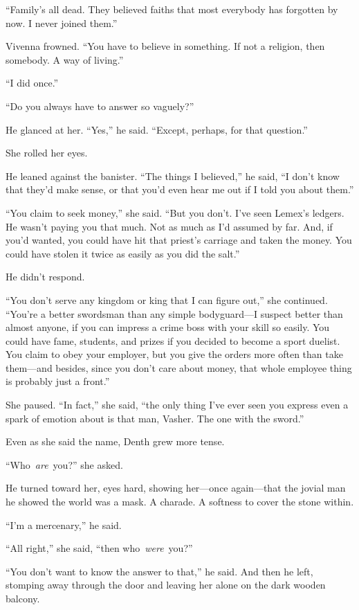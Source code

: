 “Family’s all dead. They believed faiths that most everybody has forgotten by now. I never joined them.”

Vivenna frowned. “You have to believe in something. If not a religion, then somebody. A way of living.”

“I did once.”

“Do you always have to answer so vaguely?”

He glanced at her. “Yes,” he said. “Except, perhaps, for that question.”

She rolled her eyes.

He leaned against the banister. “The things I believed,” he said, “I don’t know that they’d make sense, or that you’d even hear me out if I told you about them.”

“You claim to seek money,” she said. “But you don’t. I’ve seen Lemex’s ledgers. He wasn’t paying you that much. Not as much as I’d assumed by far. And, if you’d wanted, you could have hit that priest’s carriage and taken the money. You could have stolen it twice as easily as you did the salt.”

He didn’t respond.

“You don’t serve any kingdom or king that I can figure out,” she continued. “You’re a better swordsman than any simple bodyguard—I suspect better than almost anyone, if you can impress a crime boss with your skill so easily. You could have fame, students, and prizes if you decided to become a sport duelist. You claim to obey your employer, but you give the orders more often than take them—and besides, since you don’t care about money, that whole employee thing is probably just a front.”

She paused. “In fact,” she said, “the only thing I’ve ever seen you express even a spark of emotion about is that man, Vasher. The one with the sword.”

Even as she said the name, Denth grew more tense.

“Who~\textit{are}~you?” she asked.

He turned toward her, eyes hard, showing her—once again—that the jovial man he showed the world was a mask. A charade. A softness to cover the stone within.

“I’m a mercenary,” he said.

“All right,” she said, “then who~\textit{were}~you?”

“You don’t want to know the answer to that,” he said. And then he left, stomping away through the door and leaving her alone on the dark wooden balcony.

